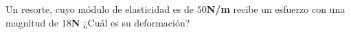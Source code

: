 
\question Un resorte, cuyo módulo de elasticidad es de $50$\textbf{N/m}
          recibe un esfuerzo con una magnitud de $18$\textbf{N} ¿Cuál es su
          deformación?


